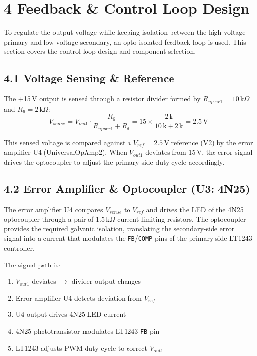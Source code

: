 \section*{4 Feedback \& Control Loop Design}

To regulate the output voltage while keeping isolation between the high-voltage primary and low-voltage secondary, an opto-isolated feedback loop is used. This section covers the control loop design and component selection.

\subsection*{4.1 Voltage Sensing \& Reference}

The +15\,V output is sensed through a resistor divider formed by $R_{upper1} = 10\,\text{k}\Omega$ and $R_6 = 2\,\text{k}\Omega$:
\begin{equation}
V_{sense} = V_{out1} \cdot \frac{R_6}{R_{upper1} + R_6} = 15 \times \frac{2\,\text{k}}{10\,\text{k} + 2\,\text{k}} = 2.5\,\text{V}
\end{equation}

This sensed voltage is compared against a $V_{ref} = 2.5\,\text{V}$ reference (V2) by the error amplifier U4 (UniversalOpAmp2). When $V_{out1}$ deviates from 15\,V, the error signal drives the optocoupler to adjust the primary-side duty cycle accordingly.

\subsection*{4.2 Error Amplifier \& Optocoupler (U3: 4N25)}

The error amplifier U4 compares $V_{sense}$ to $V_{ref}$ and drives the LED of the 4N25 optocoupler through a pair of $1.5\,\text{k}\Omega$ current-limiting resistors. The optocoupler provides the required galvanic isolation, translating the secondary-side error signal into a current that modulates the \texttt{FB}/\texttt{COMP} pins of the primary-side LT1243 controller.

The signal path is:
\begin{enumerate}
    \item $V_{out1}$ deviates $\rightarrow$ divider output changes
    \item Error amplifier U4 detects deviation from $V_{ref}$
    \item U4 output drives 4N25 LED current
    \item 4N25 phototransistor modulates LT1243 \texttt{FB} pin
    \item LT1243 adjusts PWM duty cycle to correct $V_{out1}$
\end{enumerate}

